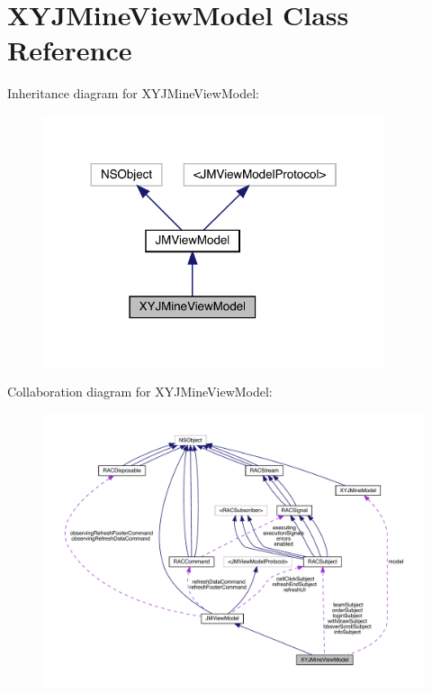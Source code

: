 \hypertarget{interface_x_y_j_mine_view_model}{}\section{X\+Y\+J\+Mine\+View\+Model Class Reference}
\label{interface_x_y_j_mine_view_model}


Inheritance diagram for X\+Y\+J\+Mine\+View\+Model\+:\nopagebreak
\begin{figure}[H]
\begin{center}
\leavevmode
\includegraphics[width=284pt]{interface_x_y_j_mine_view_model__inherit__graph}
\end{center}
\end{figure}


Collaboration diagram for X\+Y\+J\+Mine\+View\+Model\+:\nopagebreak
\begin{figure}[H]
\begin{center}
\leavevmode
\includegraphics[width=350pt]{interface_x_y_j_mine_view_model__coll__graph}
\end{center}
\end{figure}
